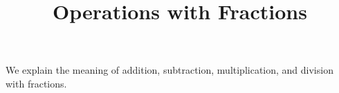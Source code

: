 \documentclass{ximera}
\title{Operations with Fractions}
\begin{document}
\begin{abstract}
\end{abstract}
\maketitle

We explain the meaning of addition, subtraction, multiplication, and division with fractions.
\end{document}
